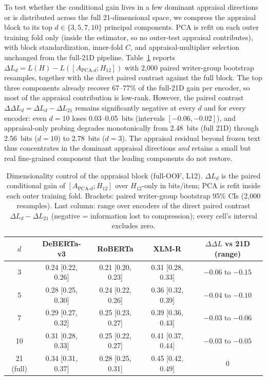 \documentclass[11pt]{article}
\begin{document}
To test whether the conditional gain lives in a few dominant appraisal directions or is distributed across the full 21-dimensional space, we compress the appraisal block to its top $d\in\{3,5,7,10\}$ principal components. PCA is refit on each outer training fold only (inside the estimator, so no outer-test appraisal contributes), with block standardization, inner-fold $C$, and appraisal-multiplier selection unchanged from the full-21D pipeline. Table~\ref{tab:pca-dims} reports $\Delta L_{d}=L(H)-L([A_{\mathrm{PCA}\text{-}d};H_{12}])$ with 2{,}000 paired writer-group bootstrap resamples, together with the direct paired contrast against the full block. The top three components already recover 67--77\% of the full-21D gain per encoder, so most of the appraisal contribution is low-rank. However, the paired contrast $\Delta\Delta L_{d}=\Delta L_{d}-\Delta L_{21}$ remains significantly negative at every $d$ and for every encoder: even $d=10$ loses 0.03--0.05~bits (intervals $[-0.06,-0.02]$), and appraisal-only probing degrades monotonically from 2.48~bits (full 21D) through 2.56~bits ($d{=}10$) to 2.78~bits ($d{=}3$). The appraisal residual beyond frozen text thus concentrates in the dominant appraisal directions \emph{and} retains a small but real fine-grained component that the leading components do not restore.

\begin{table}[h]
\centering\footnotesize
\begin{tabular}{ccccc}
\toprule
$d$ & DeBERTa-v3 & RoBERTa & XLM-R & $\Delta\Delta L$ vs 21D (range) \\
\midrule
3 & 0.24 [0.22, 0.26] & 0.21 [0.20, 0.23] & 0.31 [0.28, 0.33] & $-0.06$ to $-0.15$ \\
5 & 0.28 [0.25, 0.30] & 0.24 [0.22, 0.26] & 0.36 [0.32, 0.39] & $-0.04$ to $-0.10$ \\
7 & 0.29 [0.27, 0.32] & 0.25 [0.23, 0.27] & 0.39 [0.36, 0.43] & $-0.03$ to $-0.06$ \\
10 & 0.31 [0.28, 0.33] & 0.25 [0.22, 0.27] & 0.41 [0.37, 0.44] & $-0.03$ to $-0.05$ \\
\midrule
21 (full) & 0.34 [0.31, 0.37] & 0.28 [0.25, 0.31] & 0.45 [0.42, 0.49] & 0 \\
\bottomrule
\end{tabular}
\caption{Dimensionality control of the appraisal block (full-OOF, L12). $\Delta L_{d}$ is the paired conditional gain of $[A_{\mathrm{PCA}\text{-}d};H_{12}]$ over $H_{12}$-only in bits/item; PCA is refit inside each outer training fold. Brackets: paired writer-group bootstrap 95\% CIs (2{,}000 resamples). Last column: range over encoders of the direct paired contrast $\Delta L_{d}-\Delta L_{21}$ (negative = information lost to compression); every cell's interval excludes zero.}
\label{tab:pca-dims}
\end{table}
\end{document}
